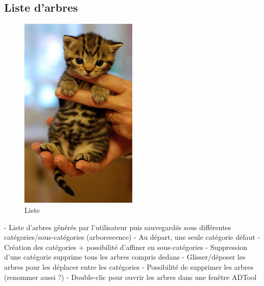 	\subsection{Liste d'arbres}
		\begin{figure}
			\begin{center}
				\includegraphics[width=0.5\textwidth]{figure/liste.png}
			\end{center}
			\caption{Liste}
			\label{fig:liste}
		\end{figure}

	- Liste d'arbres générés par l'utilisateur puis sauvegardés sous différentes catégories/sous-catégories (arborescence)
	- Au départ, une seule catégorie défaut
	- Création des catégories + possibilité d'affiner en sous-catégories
	- Suppression d'une catégorie supprime tous les arbres compris dedans
	- Glisser/déposer les arbres pour les déplacer entre les catégories
	- Possibilité de supprimer les arbres (renommer aussi ?)
	- Double-clic pour ouvrir les arbres dans une fenêtre ADTool

